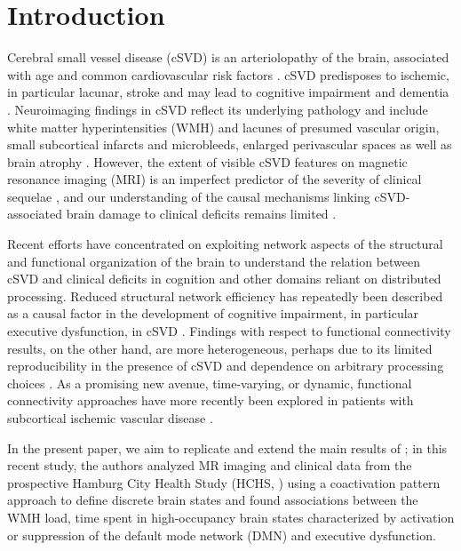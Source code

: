 \section{Introduction} \label{intro}
Cerebral small vessel disease (cSVD) is an arteriolopathy of the brain, associated with age and common cardiovascular risk factors \citep{Wardlaw2013-yd}.
cSVD predisposes to ischemic, in particular lacunar, stroke and may lead to cognitive impairment and dementia \citep{Cannistraro2019-ly}.
Neuroimaging findings in cSVD reflect its underlying pathology \citep{Wardlaw2015-ri} and include white matter hyperintensities (WMH) and lacunes of presumed vascular origin, small subcortical infarcts and microbleeds, enlarged perivascular spaces as well as brain atrophy \citep{Wardlaw2013-sc}.
However, the extent of visible cSVD features on magnetic resonance imaging (MRI) is an imperfect predictor of the severity of clinical sequelae \citep{Das2019-pc}, and our understanding of the causal mechanisms linking cSVD-associated brain damage to clinical deficits remains limited \citep{Bos2018-qj}.

Recent efforts have concentrated on exploiting network aspects of the structural \citep{Tuladhar2016-ae,Tuladhar2020-fp,Lawrence2018-ti} and functional \citep{Dey2016-qg,Schulz2021-ho} organization of the brain to understand the relation between cSVD and clinical deficits in cognition and other domains reliant on distributed processing.
Reduced structural network efficiency has repeatedly been described as a causal factor in the development of cognitive impairment, in particular executive dysfunction, in cSVD \citep{Lawrence2014-xp,Shen2020-yv,Reijmer2016-wm,Prins2005-ej}.
Findings with respect to functional connectivity results, on the other hand, are more heterogeneous, perhaps due to its limited reproducibility in the presence of cSVD and dependence on arbitrary processing choices \citep{Lawrence2018-sv,Gesierich2020-db}.
As a promising new avenue, time-varying, or dynamic, functional connectivity approaches have more recently been explored in patients with subcortical ischemic vascular disease \citep{Yin2022-cv,Xu2021-ib}.

In the present paper, we aim to replicate and extend the main results of \citep{Schlemm2022-he};
in this recent study, the authors analyzed MR imaging and clinical data from the prospective Hamburg City Health Study (HCHS, \citep{Jagodzinski2020-lx}) using a coactivation pattern approach to define discrete brain states and found associations between the WMH load, time spent in high-occupancy brain states characterized by activation or suppression of the default mode network (DMN) and executive dysfunction.

